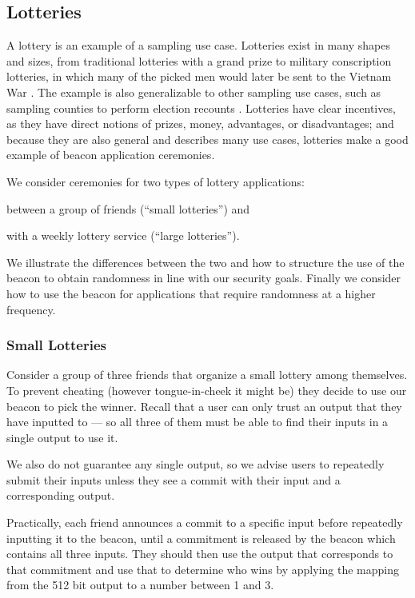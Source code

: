 \subsection{Lotteries}
A lottery is an example of a sampling use case.
Lotteries exist in many shapes and sizes, from traditional lotteries with a grand prize to military conscription lotteries, in which many of the picked men would later be sent to the Vietnam War \cite{starr1997nonrandom}. The example is also generalizable to other sampling use cases, such as sampling counties to perform election recounts \cite{bushgore}. Lotteries have clear incentives, as they have direct notions of prizes, money, advantages, or disadvantages; and because they are also general and describes many use cases, lotteries make a good example of beacon application ceremonies.

We consider ceremonies for two types of lottery applications:
\begin{eletterate*}
\item between a group of friends (\enquote{small lotteries}) and
\item with a weekly lottery service (\enquote{large lotteries}).
\end{eletterate*}
We illustrate the differences between the two and how to structure the use of the beacon to obtain randomness in line with our security goals.
Finally we consider how to use the beacon for applications that require randomness at a higher frequency.

\subsubsection{Small Lotteries}
Consider a group of three friends that organize a small lottery among themselves.
To prevent cheating (however tongue-in-cheek it might be) they decide to use our beacon to pick the winner.
Recall that a user can only trust an output that they have inputted to --- so all three of them must be able to find their inputs in a single output to use it.

We also do not guarantee any single output, so we advise users to repeatedly submit their inputs unless they see a commit with their input and a corresponding output.

Practically, each friend announces a commit to a specific input before repeatedly inputting it to the beacon, until a commitment is released by the beacon which contains all three inputs.
They should then use the output that corresponds to that commitment and use that to determine who wins by applying the mapping from the 512 bit output to a number between 1 and 3.

